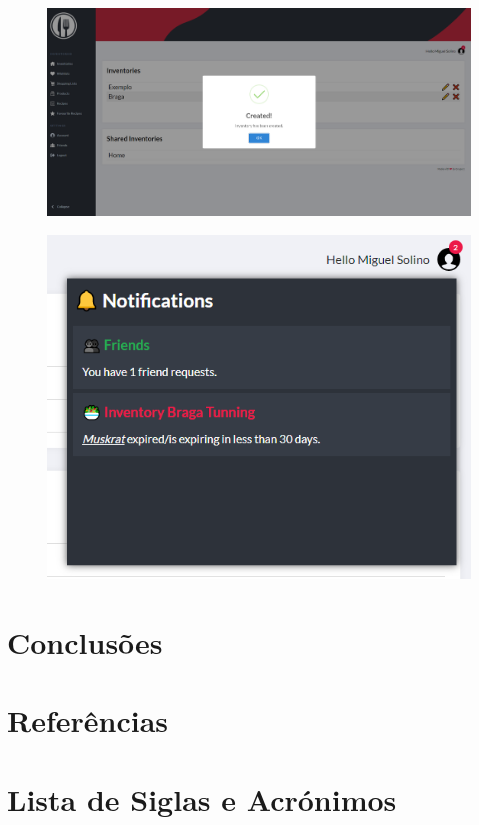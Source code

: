\documentclass[a4paper]{report}
\begin{document}
    \begin{figure}[H]
        \centering
            \includegraphics[width=\textwidth]{images/produto_final/exemplo_sucesso.png}
    \end{figure}

    \begin{figure}[H]
        \centering
            \includegraphics[width=\textwidth]{images/produto_final/notificacoes.png}
    \end{figure}

\chapter{Conclusões}

\chapter{Referências}

\chapter{Lista de Siglas e Acrónimos}
\end{document}
